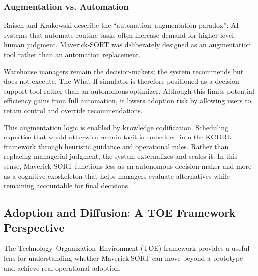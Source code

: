 
\subsubsection{Augmentation vs. Automation}

Raisch and Krakowski\parencite{raisch2021automation} describe the ``automation--augmentation paradox'': AI systems that automate routine tasks often increase demand for higher-level human judgment. Maverick-SORT was deliberately designed as an augmentation tool rather than an automation replacement.

Warehouse managers remain the decision-makers; the system recommends but does not execute. The What-If simulator is therefore positioned as a decision-support tool rather than an autonomous optimizer. Although this limits potential efficiency gains from full automation, it lowers adoption risk by allowing users to retain control and override recommendations.

This augmentation logic is enabled by knowledge codification. Scheduling expertise that would otherwise remain tacit is embedded into the KGDRL framework through heuristic guidance and operational rules. Rather than replacing managerial judgment, the system externalizes and scales it. In this sense, Maverick-SORT functions less as an autonomous decision-maker and more as a cognitive exoskeleton that helps managers evaluate alternatives while remaining accountable for final decisions.


\subsection{Adoption and Diffusion: A TOE Framework Perspective}

The Technology--Organization--Environment (TOE) framework provides a useful lens for understanding whether Maverick-SORT can move beyond a prototype and achieve real operational adoption.

